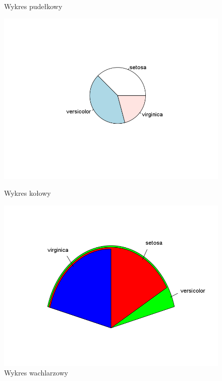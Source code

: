 \documentclass[11pt]{article}
\begin{document}
\begin{enumerate}
\begin{itemize}
\begin{figure}[H]
\begin{minipage}{.5\textwidth}
        			\caption{Wykres pudełkowy}
        		\end{minipage}
        	\end{figure}
        	\begin{figure}[H]
        		\begin{minipage}{.5\textwidth}
        			\centering
        			\includegraphics[width=\textwidth]{imgs/pie}
        			\caption{Wykres kołowy}
        		\end{minipage}
        		\begin{minipage}{.5\textwidth}
        			\centering
        			\includegraphics[width=\textwidth]{imgs/fan}
        			\caption{Wykres wachlarzowy}
        		\end{minipage}

\end{figure}
\end{itemize}
\end{enumerate}
\end{document}
